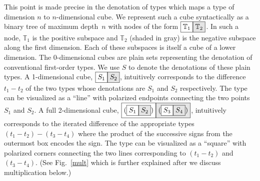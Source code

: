\documentclass[authoryear,preprint]{sigplanconf}
\newcommand{\cubt}{\mathbb{T}}
\newcommand{\nodet}[2]{\fcolorbox{black}{white}{$#1$}\fcolorbox{black}{gray!20}{$#2$}}
\begin{document}
This point is made precise in the denotation of types which maps a type of
dimension $n$ to $n$-dimensional cube. We represent such a cube syntactically
as a binary tree of maximum depth~$n$ with nodes of the form
$\nodet{\cubt_1}{\cubt_2}$. In such a node, $\cubt_1$ is the positive
subspace and $\cubt_2$ (shaded in gray) is the negative subspace along the
first dimension. Each of these subspaces is itself a cube of a lower
dimension. The $0$-dimensional cubes are plain sets representing the
denotation of conventional first-order types. We use $S$ to denote the
denotations of these plain types. A 1-dimensional cube, $\nodet{S_1}{S_2}$,
intuitively corresponds to the difference $t_1 - t_2$ of the two types whose
denotations are $S_1$ and $S_2$ respectively. The type can be visualized as a
``line'' with polarized endpoints connecting the two points $S_1$ and
$S_2$. A full 2-dimensional cube,
$\nodet{(\nodet{S_1}{S_2})}{(\nodet{S_3}{S_4})}$, intuitively corresponds to
the iterated difference of the appropriate types $(t_1-t_2)-(t_3-t_4)$ where
the product of the successive signs from the outermost box encodes the
sign. The type can be visualized as a ``square'' with polarized corners
connecting the two lines corresponding to $(t_1-t_2)$ and $(t_3-t_4)$. (See
Fig.~\ref{mult} which is further explained after we discuss multiplication
below.)
\end{document}
